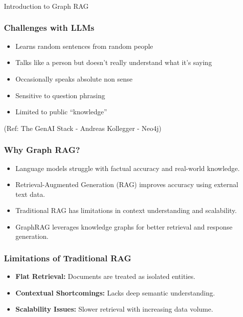 \begin{frame}[fragile]\frametitle{}
\begin{center}
{\Large Introduction to Graph RAG}
\end{center}
\end{frame}

\begin{frame}[fragile]\frametitle{Challenges with LLMs}
    \begin{itemize}
        \item Learns random sentences from random people
        \item Talks like a person but doesn't really understand what it's saying
        \item Occasionally speaks absolute non sense
        \item Sensitive to question phrasing
        \item Limited to public ``knowledge''
    \end{itemize}
	
	{\tiny (Ref: The GenAI Stack - Andreas Kollegger - Neo4j)}
	
\end{frame}

\begin{frame}[fragile]\frametitle{Why Graph RAG?}
    \begin{itemize}
        \item Language models struggle with factual accuracy and real-world knowledge.
        \item Retrieval-Augmented Generation (RAG) improves accuracy using external text data.
        \item Traditional RAG has limitations in context understanding and scalability.
        \item GraphRAG leverages knowledge graphs for better retrieval and response generation.
    \end{itemize}
\end{frame}

\begin{frame}[fragile]\frametitle{Limitations of Traditional RAG}
    \begin{itemize}
        \item \textbf{Flat Retrieval:} Documents are treated as isolated entities.
        \item \textbf{Contextual Shortcomings:} Lacks deep semantic understanding.
        \item \textbf{Scalability Issues:} Slower retrieval with increasing data volume.
    \end{itemize}
\end{frame}


